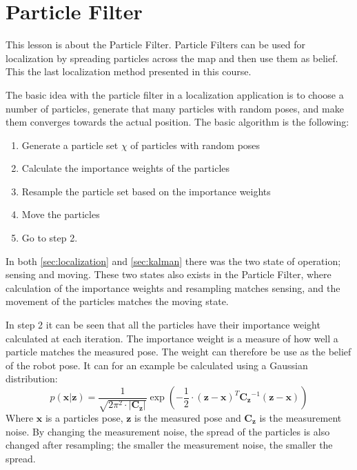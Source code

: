 \documentclass[Main]{subfiles}
\begin{document}
\section{Particle Filter} %
	\label{sec:particlefilter}
This lesson is about the Particle Filter. 
Particle Filters can be used for localization by spreading particles across the map and then use them as belief. 
This the last localization method presented in this course.

The basic idea with the particle filter in a localization application is to choose a number of particles, generate that many particles with random poses, and make them converges towards the actual position.
The basic algorithm is the following:
\begin{enumerate}
\item Generate a particle set $\chi$ of particles with random poses 
\item Calculate the importance weights of the particles 
\item Resample the particle set based on the importance weights
\item Move the particles
\item Go to step 2.
\end{enumerate}
In both \autoref{sec:localization} and \autoref{sec:kalman} there was the two state of operation; sensing and moving.
These two states also exists in the Particle Filter, where calculation of the importance weights and resampling matches sensing, and the movement of the particles matches the moving state.

In step 2 it can be seen that all the particles have their importance weight calculated at each iteration.
The importance weight is a measure of how well a particle matches the measured pose.
The weight can therefore be use as the belief of the robot pose.
It can for an example be calculated using a Gaussian distribution:
\begin{equation}
	p(\mathbf{x}|\mathbf{z}) = \frac{1}{\sqrt{2\pi^2 \cdot |\mathbf{C_z}|}} \exp \left( -\frac{1}{2}\cdot (\mathbf{z}-\mathbf{x})^T \mathbf{C_z}^{-1} (\mathbf{z}-\mathbf{x}) \right)
\end{equation}
Where $\mathbf{x}$ is a particles pose, $\mathbf{z}$ is the measured pose and $\mathbf{C_z}$ is the measurement noise.
By changing the measurement noise, the spread of the particles is also changed after resampling; the smaller the measurement noise, the smaller the spread.
\end{document}
